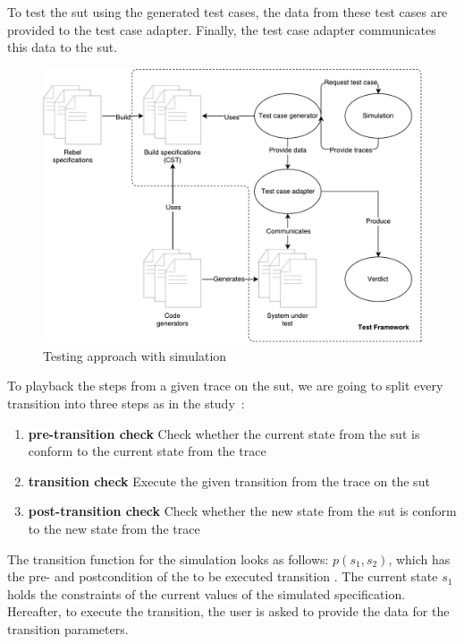 To test the \gls{sut} using the generated test cases, the data
from these test cases are provided to the test case adapter. Finally, the test
case adapter communicates this data to the \gls{sut}.

\begin{figure}[h!]
  \centering
  \includegraphics[width=\linewidth{}]{figures/simulation-diagram.pdf}
  \caption{Testing approach with simulation}\label{fig:simulation-testing}
\end{figure}
\FloatBarrier

To playback the steps from a given trace on the \gls{sut}, we are going to split every
transition into three steps as in the
study~\cite[p.~6]{stoel_storm_vinju_bosman_2016}:
\begin{enumerate}
\item \textbf{pre-transition check} Check whether the current state from the \gls{sut}
is conform to the current state from the trace
\item \textbf{transition check} Execute the given transition from the trace on
the \gls{sut}
\item \textbf{post-transition check} Check whether the new state from the \gls{sut} is
conform to the new state from the trace
\end{enumerate}

The transition function for the simulation looks as follows: $p(s_{1}, s_{2})$,
which has the pre- and postcondition of the to be executed transition
\cite[p.~6]{stoel_storm_vinju_bosman_2016}. The current state $s_{1}$ holds the
constraints of the current values of the simulated specification. Hereafter, to
execute the transition, the user is asked to provide the data for the transition
parameters.

